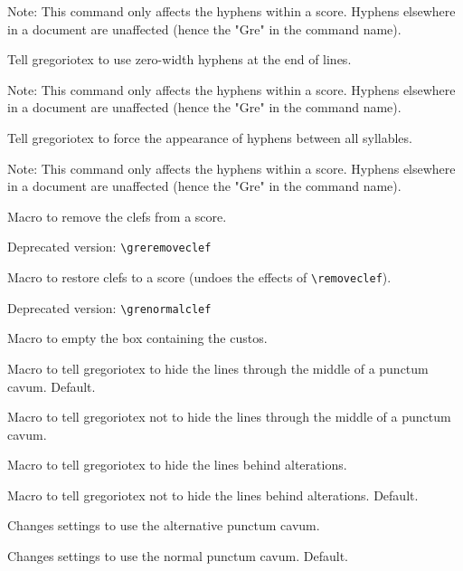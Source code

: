 Note: This command only affects the hyphens within a score.  Hyphens
elsewhere in a document are unaffected (hence the "Gre" in the command
name).

Tell gregoriotex to use zero-width hyphens at the end of lines.

Note: This command only affects the hyphens within a score.  Hyphens
elsewhere in a document are unaffected (hence the "Gre" in the command
name).

Tell gregoriotex to force the appearance of hyphens between all
syllables.

Note: This command only affects the hyphens within a score.  Hyphens
elsewhere in a document are unaffected (hence the "Gre" in the command
name).

Macro to remove the clefs from a score.

\smallskip\hspace{15pt} Deprecated version: \verb=\greremoveclef=

Macro to restore clefs to a score (undoes the effects of
\verb=\removeclef=).

\smallskip\hspace{15pt} Deprecated version: \verb=\grenormalclef=

Macro to empty the box containing the custos.

Macro to tell gregoriotex to hide the lines through the middle of a
punctum cavum.  Default.

Macro to tell gregoriotex not to hide the lines through the middle of
a punctum cavum.

Macro to tell gregoriotex to hide the lines behind alterations.

Macro to tell gregoriotex not to hide the lines behind alterations.
Default.

Changes settings to use the alternative punctum cavum.

Changes settings to use the normal punctum cavum.  Default.

